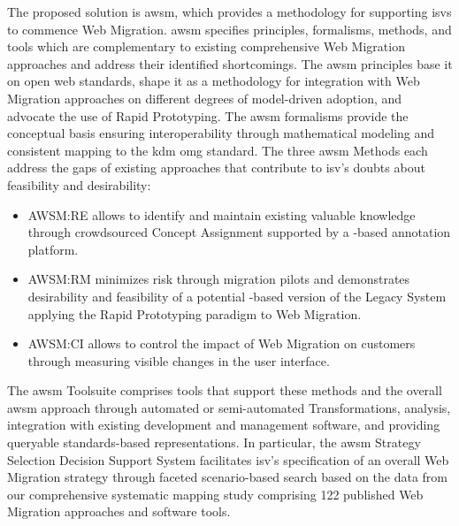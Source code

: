The proposed solution is \gls{awsm}, which provides a methodology for supporting \glspl{isv} to commence \gls{Web Migration}.
\gls{awsm} specifies principles, formalisms, methods, and tools which are complementary to existing comprehensive \gls{Web Migration} approaches and address their identified shortcomings.
The \gls{awsm} principles base it on open \gls{web} standards, shape it as a methodology for integration with \gls{Web Migration} approaches on different degrees of model-driven adoption, and advocate the use of \gls{Rapid Prototyping}.
The \gls{awsm} formalisms provide the conceptual basis ensuring interoperability through mathematical modeling and consistent mapping to the \gls{kdm} \gls{omg} standard.
The three \gls{awsm} Methods each address the gaps of existing approaches that contribute to \gls{isv}'s doubts about feasibility and desirability:

\begin{itemize}
\tightlist
\item
  AWSM:RE allows to identify and maintain existing valuable knowledge through crowdsourced \gls{Concept Assignment} supported by a -based annotation platform.
\item
  AWSM:RM minimizes risk through migration pilots and demonstrates desirability and feasibility of a potential -based version of the \gls{Legacy System} applying the \gls{Rapid Prototyping} paradigm to \gls{Web Migration}.
\item
  AWSM:CI allows to control the impact of \gls{Web Migration} on customers through measuring visible changes in the user interface.
\end{itemize}

The \gls{awsm} Toolsuite comprises tools that support these methods and the overall \gls{awsm} approach through automated or semi-automated \glspl{Transformation}, analysis, integration with existing development and management software, and providing queryable standards-based representations.
In particular, the \gls{awsm} Strategy Selection Decision Support System facilitates \gls{isv}'s specification of an overall \gls{Web Migration} strategy through faceted scenario-based search based on the data from our comprehensive systematic mapping study comprising 122 published \gls{Web Migration} approaches and software tools.

